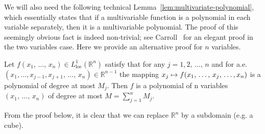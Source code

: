 \documentclass[AHL, Unicode, longabstracts, published]{cedram}
\newcommand*\R {\mathbb{R}}
\newcommand\1{{\ensuremath {\mathds 1} }}
\DeclareMathOperator{\loc}{loc}
\begin{document}
We will also need the following technical Lemma~\ref{lem:multivariate-polynomial}, which essentially states that if a multivariable function is a polynomial in each variable separately, then it is a multivariable polynomial. The proof of this seemingly obvious fact is indeed non-trivial; see Carroll~\cite{Carroll-61} for an elegant proof in the two variables case. Here we provide an alternative proof for $n$ variables.

\begin{lemm}\label{lem:multivariate-polynomial}
Let $f(x_1,\,\ldots,\,x_n) \in L^1_{\loc}(\R^n)$ satisfy that for any $j=1,2,\,\ldots,\,n$ and for a.e. $(x_1,\ldots,x_{j-1},x_{j+1},\,\ldots,\,x_n) \in \R^{n-1}$ the mapping $x_j\mapsto f(x_1,\,\ldots,\,x_j,\,\ldots,\linebreak x_n)$ is a polynomial of degree at most $M_j$. Then $f$ is a polynomial of n variables $(x_1,\,\ldots,\,x_n)$ of degree at most $M=\sum_{j=1}^n M_j$.
\end{lemm}

From the proof below, it is clear that we can replace $\R^n$ by a subdomain (e.g. a cube).
\end{document}
